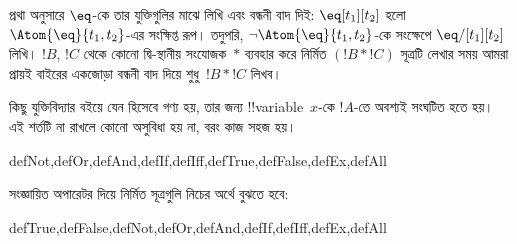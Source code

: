 \documentclass[../../../include/open-logic-section]{subfiles}
\begin{document}
প্রথা অনুসারে $\eq$-কে তার যুক্তিগুলির মাঝে লিখি এবং বন্ধনী বাদ দিই:
$\eq[t_1][t_2]$ হলো $\Atom{\eq}{t_1,t_2}$-এর সংক্ষিপ্ত রূপ। তদুপরি,
$\lnot \Atom{\eq}{t_1,t_2}$-কে সংক্ষেপে $\eq/[t_1][t_2]$ লিখি।
$!B$, $!C$ থেকে কোনো দ্বি-স্থানীয় সংযোজক~$\ast$ ব্যবহার করে নির্মিত
$(!B \ast !C)$ সূত্রটি লেখার সময় আমরা প্রায়ই বাইরের একজোড়া বন্ধনী
বাদ দিয়ে শুধু~$!B \ast !C$ লিখব।

\begin{intro}
কিছু যুক্তিবিদ্যার বইয়ে
%
%
%
যেন
হিসেবে গণ্য হয়, তার জন্য !!{variable}~$x$-কে $!A$-তে অবশ্যই সংঘটিত
হতে হয়। এই শর্তটি না রাখলে কোনো অসুবিধা হয় না, বরং কাজ সহজ হয়।
\end{intro}

\begin{tagblock}{defNot,defOr,defAnd,defIf,defIff,defTrue,defFalse,defEx,defAll}
\begin{defn}
সংজ্ঞায়িত অপারেটর দিয়ে নির্মিত সূত্রগুলি নিচের অর্থে বুঝতে হবে:

\begin{tagenumerate}{defTrue,defFalse,defNot,defOr,defAnd,defIf,defIff,defEx,defAll}









\end{tagenumerate}

\end{defn}
\end{tagblock}
\end{document}
